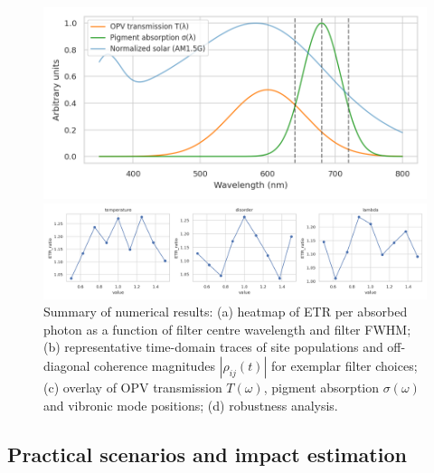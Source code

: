 \documentclass[aps,prb,onecolumn,superscriptaddress,notitlepage,nofootinbib,longbibliography,10pt]{revtex4-2}
\begin{document}
\begin{figure}[h]
\begin{minipage}{0.49\textwidth}
    \centering
    \includegraphics[width=\textwidth]{figures/overlay.png}
\end{minipage}\hfill
\begin{minipage}{0.49\textwidth}
    \centering
    \includegraphics[width=\textwidth]{figures/robustness.png}
\end{minipage}

\caption{Summary of numerical results: (a) heatmap of ETR per absorbed photon as a function of filter centre wavelength and filter FWHM; (b) representative time-domain traces of site populations and off-diagonal coherence magnitudes $|\mathtt{\rho}_{ij}(t)|$ for exemplar filter choices; (c) overlay of OPV transmission $T(\omega)$, pigment absorption $\sigma(\omega)$ and vibronic mode positions; (d) robustness analysis.}
\label{fig:placeholders}
\end{figure}

\subsection*{Practical scenarios and impact estimation}
\end{document}

